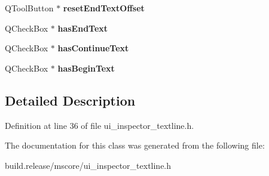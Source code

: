 \begin{DoxyCompactItemize}
\mbox{\label{class_ui___inspector_text_line_a34a65f05046a119de23aa64e7cbec2d0}} 
Q\+Tool\+Button $\ast$ {\bfseries reset\+End\+Text\+Offset}
\item 
\mbox{\label{class_ui___inspector_text_line_af8d691b2e24e2c67f885ad8b4e1b847f}} 
Q\+Check\+Box $\ast$ {\bfseries has\+End\+Text}
\item 
\mbox{\label{class_ui___inspector_text_line_aeae1d7edea22f8c514d7a02260b1c9d9}} 
Q\+Check\+Box $\ast$ {\bfseries has\+Continue\+Text}
\item 
\mbox{\label{class_ui___inspector_text_line_a41041488a0d9d02915e2c78ac2b80a77}} 
Q\+Check\+Box $\ast$ {\bfseries has\+Begin\+Text}
\end{DoxyCompactItemize}


\subsection{Detailed Description}


Definition at line 36 of file ui\+\_\+inspector\+\_\+textline.\+h.



The documentation for this class was generated from the following file\+:\begin{DoxyCompactItemize}
\item 
build.\+release/mscore/ui\+\_\+inspector\+\_\+textline.\+h\end{DoxyCompactItemize}

